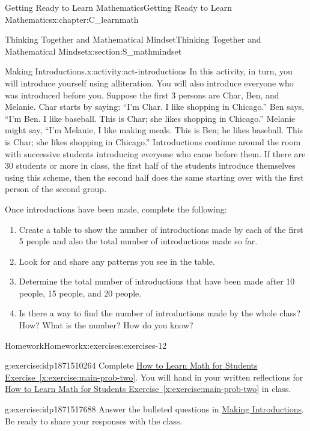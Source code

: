 \documentclass[oneside,10pt,]{book}
\newcommand{\xreffont}{\relax}
\numberwithin{equation}{chapter}
\begin{document}
\begin{chapterptx}{Getting Ready to Learn Mathematics}{}{Getting Ready to Learn Mathematics}{}{}{x:chapter:C_learnmath}
\begin{sectionptx}{Thinking Together and Mathematical Mindset}{}{Thinking Together and Mathematical Mindset}{}{}{x:section:S_mathmindset}
\begin{activity}{Making Introductions.}{x:activity:act-introductions}
In this activity, in turn, you will introduce yourself using alliteration. You will also introduce everyone who was introduced before you. Suppose the first 3 persons are Char, Ben, and Melanie. Char starts by saying: ``I'm Char. I like shopping in Chicago.'' Ben says, ``I'm Ben. I like baseball. This is Char; she likes shopping in Chicago.'' Melanie might say, ``I'm Melanie, I like making meals. This is Ben; he likes baseball. This is Char; she likes shopping in Chicago.'' Introductions continue around the room with successive students introducing everyone who came before them. If there are 30 students or more in class, the first half of the students introduce themselves using this scheme, then the second half does the same starting over with the first person of the second group.%
\par
Once introductions have been made, complete the following:%
\begin{enumerate}[font=\bfseries,label=(\alph*),ref=\alph*]
\item{}Create a table to show the number of introductions made by each of the first 5 people and also the total number of introductions made so far.%
\item{}Look for and share any patterns you see in the table.%
\item{}Determine the total number of introductions that have been made after 10 people, 15 people, and 20 people.%
\item{}Is there a way to find the number of introductions made by the whole class? How? What is the number? How do you know?%
\end{enumerate}
\end{activity}%
%
%
\typeout{************************************************}
\typeout{************************************************}
%
\begin{exercises-subsection}{Homework}{}{Homework}{}{}{x:exercises:exercises-12}
\begin{divisionexercise}{1}{}{}{g:exercise:idp1871510264}%
Complete \hyperref[x:exercise:main-prob-two]{How to Learn Math for Students Exercise~{\xreffont\ref{x:exercise:main-prob-two}}}. You will hand in your written reflections for \hyperref[x:exercise:main-prob-two]{How to Learn Math for Students Exercise~{\xreffont\ref{x:exercise:main-prob-two}}} in class.%
\end{divisionexercise}%
\begin{divisionexercise}{2}{}{}{g:exercise:idp1871517688}%
Answer the bulleted questions in \hyperref[x:activity:act-introductions]{Making Introductions}. Be ready to share your responses with the class.%

\end{divisionexercise}
\end{exercises-subsection}
\end{sectionptx}
\end{chapterptx}
\end{document}
